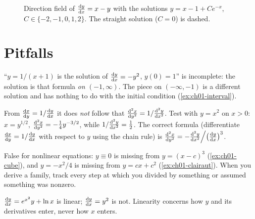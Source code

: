 \begin{figure}[ht]
  \centering
  
  \caption{Direction field of $\frac{\mathrm{d}y}{\mathrm{d}x} = x - y$ with the solutions
  $y = x - 1 + Ce^{-x}$, $C\in\{-2,-1,0,1,2\}$. The straight solution
  ($C = 0$) is dashed.}
  \label{fig:ch01-field}
\end{figure}

\section{Pitfalls}\label{sec:ch01-pitfalls}

\begin{pitfall}\label{pit:ch01-no-interval}
``$y = 1/(x+1)$ is the solution of $\frac{\mathrm{d}y}{\mathrm{d}x} = -y^2$, $y(0) = 1$'' is
incomplete: the solution is that formula \emph{on $(-1,\infty)$}. The piece on
$(-\infty,-1)$ is a different solution and has nothing to do with the initial
condition (\cref{ex:ch01-interval}).
\end{pitfall}

\begin{pitfall}\label{pit:ch01-second-derivative}
From $\frac{\mathrm{d}x}{\mathrm{d}y} = 1/\frac{\mathrm{d}y}{\mathrm{d}x}$ it does \emph{not} follow that
$\frac{\mathrm{d}^{2}x}{\mathrm{d}y^{2}} = 1/\frac{\mathrm{d}^{2}y}{\mathrm{d}x^{2}}$. Test with $y = x^2$ on $x>0$:
$x = y^{1/2}$, $\frac{\mathrm{d}^{2}x}{\mathrm{d}y^{2}} = -\tfrac14 y^{-3/2}$, while
$1/\frac{\mathrm{d}^{2}y}{\mathrm{d}x^{2}} = \tfrac12$. The correct formula (differentiate
$\frac{\mathrm{d}x}{\mathrm{d}y} = 1/\frac{\mathrm{d}y}{\mathrm{d}x}$ with respect to $y$ using the chain rule) is
$\frac{\mathrm{d}^{2}x}{\mathrm{d}y^{2}} = -\frac{\mathrm{d}^{2}y}{\mathrm{d}x^{2}}\Big/\bigl(\frac{\mathrm{d}y}{\mathrm{d}x}\bigr)^3$.
\end{pitfall}

\begin{pitfall}\label{pit:ch01-general}
False for nonlinear equations: $y\equiv0$ is missing from $y = (x-c)^3$
(\cref{ex:ch01-cube}), and $y = -x^2/4$ is missing from $y = cx+c^2$
(\cref{ex:ch01-clairaut}). When you derive a family, track every step at which
you divided by something or assumed something was nonzero.
\end{pitfall}

\begin{pitfall}\label{pit:ch01-linearity}
$\frac{\mathrm{d}y}{\mathrm{d}x} = e^{x^2}y + \ln x$ is linear; $\frac{\mathrm{d}y}{\mathrm{d}x} = y^2$ is not.
Linearity concerns how $y$ and its derivatives enter, never how $x$ enters.
\end{pitfall}

